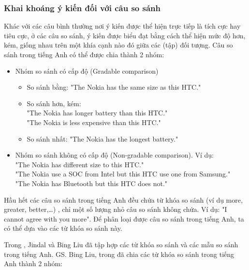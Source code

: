 \documentclass[12pt]{extarticle}
\begin{document}
			\subsubsection*{Khai khoáng ý kiến đối với câu so sánh}
				\par Khác với các câu bình thường nơi ý kiến được thể hiện trực tiếp là tích cực hay tiêu cực, ở các câu so sánh, ý kiến được biểu đạt bằng cách thể hiện mức độ hơn, kém, giống nhau trên một khía cạnh nào đó giữa các (tập) đối tượng. Câu so sánh trong tiếng Anh có thể được chia thành 2 nhóm:
				\begin{itemize}
					\item{Nhóm so sánh có cấp độ (Gradable comparison)}	
					\begin{itemize}
						\item{So sánh bằng: "The Nokia has the same size as this HTC."}					
						\item{So sánh hơn, kém: \\"The Nokia has longer battery than this HTC."\\"The Nokia is less expensive than this HTC."}
						\item{So sánh nhất: "The Nokia has the longest battery."}
					\end{itemize}				
					\item{Nhóm so sánh không có cấp độ (Non-gradable comparison). Ví dụ:
						\\"The Nokia has different size to this HTC."
						\\"The Nokia use a SOC from Intel but this HTC use one from Samsung."
						\\"The Nokia has Bluetooth but this HTC does not."}					
				\end{itemize}
				\par Hầu hết các câu so sánh trong tiếng Anh đều chứa từ khóa so sánh (ví dụ more, greater, better,…) \cite{sentiment}, chỉ một số lượng nhỏ câu so sánh không chứa. Ví dụ: "I cannot agree with you more". Để phân loại được câu so sánh trong tiếng Anh, ta có thể dựa vào các từ khóa so sánh này.
				\par Trong \cite{comparative1}, Jindal và Bing Liu đã tập hợp các từ khóa so sánh và các mẫu so sánh trong tiếng Anh. GS. Bing Liu, trong \cite{sentiment} đã chia các từ khóa so sánh trong tiếng Anh thành 2 nhóm:
\end{document}
